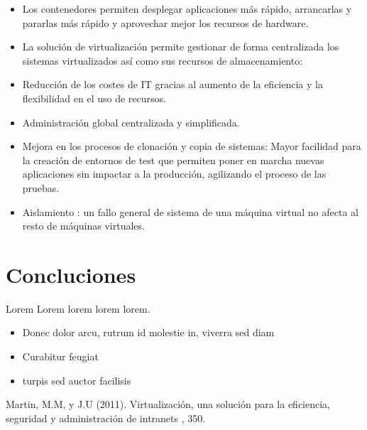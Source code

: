 \documentclass[twoside,twocolumn]{article}
\begin{document}
\begin{itemize}
	\item Los contenedores permiten desplegar aplicaciones más rápido, arrancarlas y pararlas más rápido y aprovechar mejor los recursos de hardware.
	\item La solución de virtualización permite gestionar de forma centralizada los sistemas virtualizados así como sus recursos de almacenamiento:
	\item Reducción de los costes de IT gracias al aumento de la eficiencia y la flexibilidad en el uso de recursos.
	\item Administración global centralizada y simplificada.
	\item Mejora en los procesos de clonación y copia de sistemas: Mayor facilidad para la creación de entornos de test que permiten poner en marcha nuevas aplicaciones sin impactar a la producción, agilizando el proceso de las pruebas.
	\item Aislamiento : un fallo general de sistema de una máquina virtual no afecta al resto de máquinas virtuales.



\end{itemize} 

\section{Concluciones}

Lorem Lorem lorem lorem lorem. 
\begin{itemize}
\item Donec dolor arcu, rutrum id molestie in, viverra sed diam
\item Curabitur feugiat
\item turpis sed auctor facilisis

\end{itemize}

\begin{thebibliography}{99} %

Martin, M.M,  y J.U (2011).
\newblock Virtualización, una solución para la eficiencia,
seguridad y administración de intranets
, 350.
 
 
\end{thebibliography}

\end{document}
